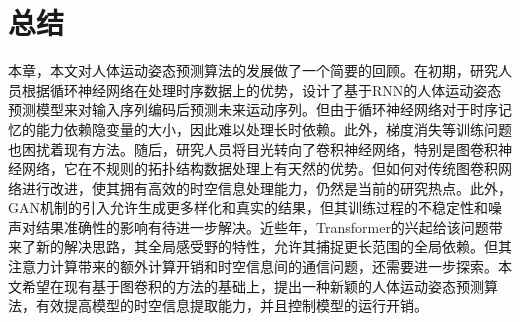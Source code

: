 
\section{总结}
本章，本文对人体运动姿态预测算法的发展做了一个简要的回顾。在初期，研究人员根据循环神经网络在处理时序数据上的优势，设计了基于RNN的人体运动姿态预测模型来对输入序列编码后预测未来运动序列。但由于循环神经网络对于时序记忆的能力依赖隐变量的大小，因此难以处理长时依赖。此外，梯度消失等训练问题也困扰着现有方法。随后，研究人员将目光转向了卷积神经网络，特别是图卷积神经网络，它在不规则的拓扑结构数据处理上有天然的优势。但如何对传统图卷积网络进行改进，使其拥有高效的时空信息处理能力，仍然是当前的研究热点。此外，GAN机制的引入允许生成更多样化和真实的结果，但其训练过程的不稳定性和噪声对结果准确性的影响有待进一步解决。近些年，Transformer的兴起给该问题带来了新的解决思路，其全局感受野的特性，允许其捕捉更长范围的全局依赖。但其注意力计算带来的额外计算开销和时空信息间的通信问题，还需要进一步探索。本文希望在现有基于图卷积的方法的基础上，提出一种新颖的人体运动姿态预测算法，有效提高模型的时空信息提取能力，并且控制模型的运行开销。


